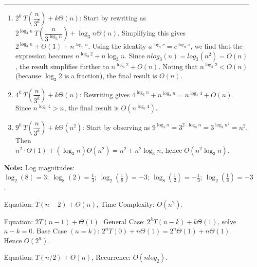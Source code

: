 \noindent\rule{\textwidth}{0.4pt}
    

\begin{Answer}

    \begin{enumerate}
        \item $2^{k}\ T \left(\dfrac{n}{3^k} \right) + k \Theta(n)$: Start by rewriting as $2^{\log_3n}\ T \left(\dfrac{n}{3^{\log_3n}} \right) + \log_3n \Theta(n)$.
        Simplifying this gives $2^{\log_3n} + \Theta(1) + n^{\log_3n}$. Using the identity $a^{\log_b c} = c^{\log_b a}$,
        we find that the expression becomes $n^{\log_3 2} + n \log_3n$. Since $nlog_3(n)=log_3(n^2)=O(n)$, the result simplifies further to $n^{\log_3 2} + O(n)$. Noting that $n^{\log_3 2} < O(n)$ (because $\log_3 2$ is a fraction), the final result is $O(n)$.
    
        \item $4^{k}\ T \left(\dfrac{n}{3^k} \right) + k \Theta(n)$: Rewriting gives $4^{\log_3n} + n^{\log_3n} = n^{\log_3 4} + O(n)$. Since $n^{\log_3 4} > n$, the final result is $O(n^{\log_3 4})$.
    
        \item $9^{k}\ T \left(\dfrac{n}{3^k} \right) + k \Theta(n^2)$: Start by observing as $9^{\log_3n} = 3^{2 \cdot \log_3n} = 3^{\log_3n^2} = n^2$. Then\\ $n^2\cdot\Theta(1)+(\log_3n)\Theta(n^2)=n^2+n^2\log_3n$, hence $O(n^2 \log_3n)$.
    \end{enumerate}
    
\end{Answer}

\begin{Note}
    \textbf{Note:} Log magnitudes: $\log_2(8)=3;\ \log_8(2)=\frac{1}{3};\ \log_2(\frac{1}{8})=-3;\ \log_8(\frac{1}{2})=-\frac{1}{3};\ \log_2(\frac{1}{8})=-3$. 
\end{Note}

\begin{Answer} Equation: $T(n-2) + \Theta(n)$, Time Complexity: $O(n^2)$.
\end{Answer}

\vspace{.5em}
\begin{Answer} Equation: $2 T(n-1) + \Theta(1)$. General Case: $2^kT(n-k) + k\Theta(1)$, solve $n-k=0$.
    Base Case $(n=k)$: $2^n T(0) + n\Theta(1)=2^n \Theta(1) + n\Theta(1)$. Hence $O(2^n)$.
\end{Answer}

\vspace{.5em}
\begin{Answer} Equation: $T(n/2) + \Theta(n)$, Recurrence: $O(n log_2 )$. 
\end{Answer}

